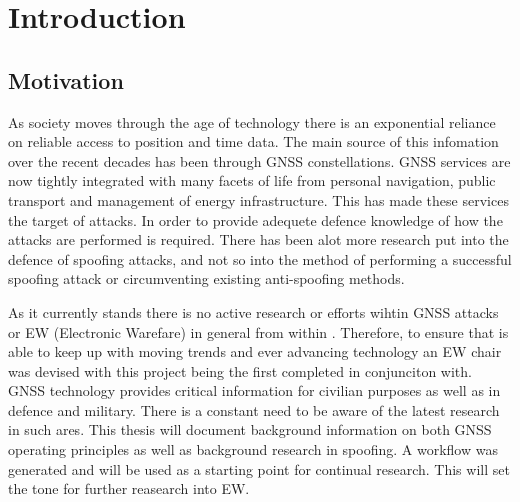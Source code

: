 
\chapter{Introduction}\label{chapter:firstchapter} %

\label{Chapter1} %

\section{Motivation}\label{sec:Motivation}


As society moves through the age of technology there is an exponential reliance on reliable access to position and time data. The main source of this infomation over the
recent decades has been through GNSS constellations. GNSS services are now tightly integrated with many facets of life from personal navigation, public transport and
management of energy infrastructure. This has made these services the target of attacks. In order to provide adequete defence knowledge of how the attacks are performed is
required. There has been alot more research put into the defence of spoofing attacks, and not so into the method of performing a successful spoofing attack or
circumventing existing anti-spoofing methods. 

As it currently stands there is no active research or efforts wihtin GNSS attacks or EW (Electronic Warefare) in general from within \univname. Therefore, to ensure that \univname is able to keep up with moving trends and
ever advancing technology an EW chair was devised with this project being the first completed in conjunciton with. GNSS technology provides critical information for
civilian purposes as well as in defence and military. There is a constant need to be aware of the latest research in such ares.   
This thesis will document background information on both GNSS operating principles as well as background research in
spoofing. A workflow was generated and will be used as a starting point for continual research. This will set the tone for further reasearch into EW.

